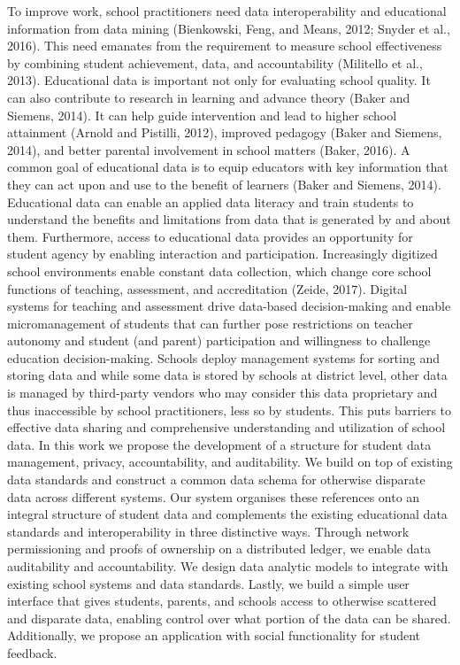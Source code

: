 \documentclass{article}
\begin{document}
To improve work, school practitioners need data interoperability and educational information from data mining (Bienkowski, Feng, and Means, 2012; Snyder et al., 2016). This need emanates from the requirement to measure school effectiveness by combining student achievement, data, and accountability (Militello et al., 2013).
\bigbreak
Educational data is important not only for evaluating school quality. It can also contribute to research in learning and advance theory (Baker and Siemens, 2014). It can help guide intervention and lead to higher school attainment (Arnold and Pistilli, 2012), improved pedagogy (Baker and Siemens, 2014), and better parental involvement in school matters (Baker, 2016). A common goal of educational data is to equip educators with key information that they can act upon and use to the benefit of learners (Baker and Siemens, 2014). Educational data can enable an applied data literacy and train students to understand the benefits and limitations from data that is generated by and about them. Furthermore, access to educational data provides an opportunity for student agency by enabling interaction and participation.
\bigbreak
Increasingly digitized school environments enable constant data collection, which change core school functions of teaching, assessment, and accreditation (Zeide, 2017). Digital systems for teaching and assessment drive data-based decision-making and enable micromanagement of students that can further pose restrictions on teacher autonomy and student (and parent) participation and willingness to challenge education decision-making. Schools deploy management systems for sorting and storing data and while some data is stored by schools at district level, other data is managed by third-party vendors who may consider this data proprietary and thus inaccessible by school practitioners, less so by students. This puts barriers to effective data sharing and comprehensive understanding and utilization of school data.
\bigbreak
In this work we propose the development of a structure for student data management, privacy, accountability, and auditability. We build on top of existing data standards and construct a common data schema for otherwise disparate data across different systems. Our system organises these references onto an integral structure of student data and complements the existing educational data standards and interoperability in three distinctive ways. Through network permissioning and proofs of ownership on a distributed ledger, we enable data auditability and accountability. We design data analytic models to integrate with existing school systems and data standards. Lastly, we build a simple user interface that gives students, parents, and schools access to otherwise scattered and disparate data, enabling control over what portion of the data can be shared. Additionally, we propose an application with social functionality for student feedback. 
\end{document}
